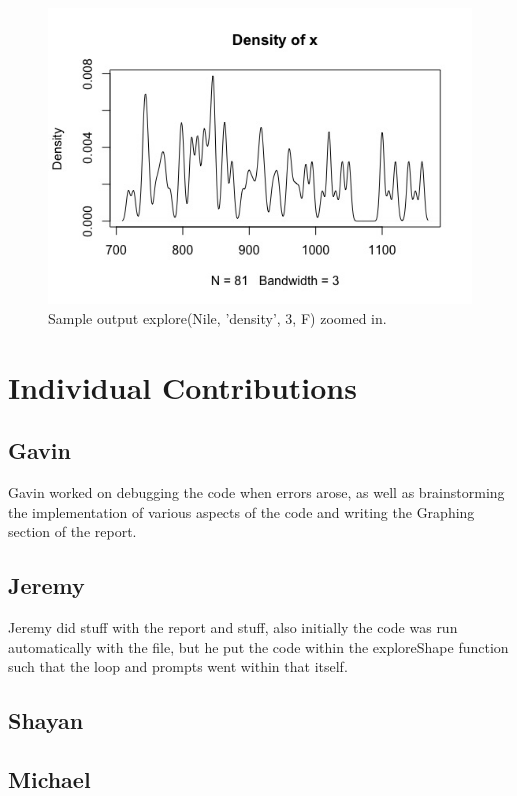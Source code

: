 \documentclass{article}
\begin{document}
\begin{figure}[H]
\centering
\includegraphics[scale=0.5]{Nile, 3 density after zoom in.jpeg}
\caption{Sample output explore(Nile, 'density', 3, F) zoomed in. }
\label{fig:Nile density graph 3, zoom in}
\end{figure}




\section{Individual Contributions}

\subsection{Gavin}
Gavin worked on debugging the code when errors arose, as well as brainstorming the implementation of various aspects of the code and writing the Graphing section of the report.

\subsection{Jeremy}
Jeremy did stuff with the report and stuff, also initially the code was run automatically with the file, but he put the code within the exploreShape function such that the loop and prompts went within that itself.

\subsection{Shayan}

\subsection{Michael}


%
%
\end{document}
